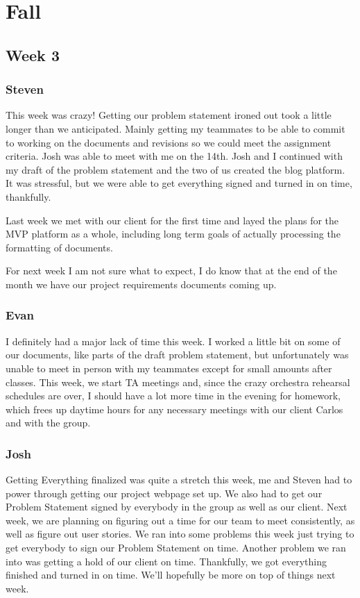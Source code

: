 \documentclass[onecolumn, draftclsnofoot,10pt, compsoc]{IEEEtran}
\begin{document}
\section{Fall}

\subsection{Week 3}
\subsubsection{Steven}

This week was crazy! Getting our problem statement ironed out took a little longer than we anticipated. Mainly getting my teammates to be able to commit to working on the documents and revisions so we could meet the assignment criteria. Josh was able to meet with me on the 14th. Josh and I continued with my draft of the problem statement and the two of us created the blog platform. It was stressful, but we were able to get everything signed and turned in on time, thankfully.

Last week we met with our client for the first time and layed the plans for the MVP platform as a whole, including long term goals of actually processing the formatting of documents.

For next week I am not sure what to expect, I do know that at the end of the month we have our project requirements documents coming up. 

\subsubsection{Evan}

I definitely had a major lack of time this week. I worked a little bit on some of our documents, like parts of the draft problem statement, but unfortunately was unable to meet in person with my teammates except for small amounts after classes. This week, we start TA meetings and, since the crazy orchestra rehearsal schedules are over, I should have a lot more time in the evening for homework, which frees up daytime hours for any necessary meetings with our client Carlos and with the group.

\subsubsection{Josh}

Getting Everything finalized was quite a stretch this week, me and Steven had to power through getting our project webpage set up. We also had to get our Problem Statement signed by everybody in the group as well as our client. Next week, we are planning on figuring out a time for our team to meet consistently, as well as figure out user stories. We ran into some problems this week just trying to get everybody to sign our Problem Statement on time. Another problem we ran into was getting a hold of our client on time. Thankfully, we got everything finished and turned in on time. We'll hopefully be more on top of things next week.
\end{document}
